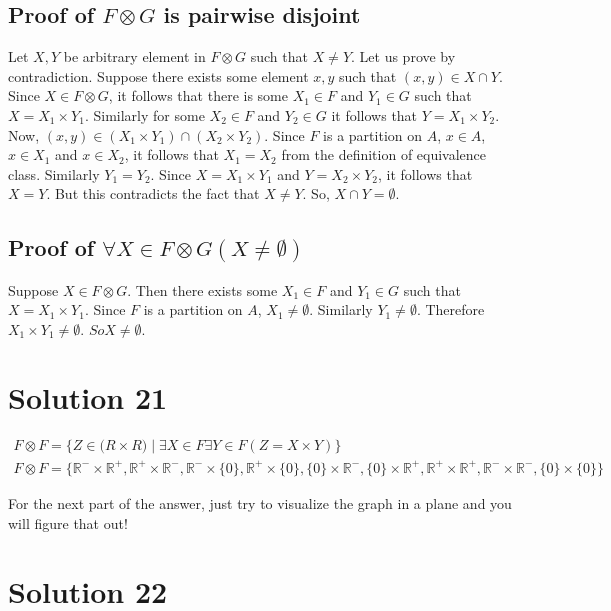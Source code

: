 \documentclass{article}
\begin{document}
\subsection{Proof of $F \otimes G$ is pairwise disjoint}
Let $X,Y$ be arbitrary element in $F \otimes G$ such that $X \neq Y$.
Let us prove by contradiction. Suppose there exists some element $x,y$
such that $(x,y) \in X \cap Y$. Since $X \in F \otimes G$, it follows
that there is some $X_1 \in F$ and $Y_1 \in G$ such that $X = X_1
\times Y_1$. Similarly for some $X_2 \in F$ and $Y_2 \in G$ it follows
that $Y = X_1 \times Y_2$. Now, $(x,y) \in (X_1 \times Y_1) \cap (X_2
\times Y_2)$. Since $F$ is a partition on $A$, $x \in A$, $x \in X_1$
and $x \in X_2$, it follows that $X_1 = X_2$ from the definition of
equivalence class. Similarly $Y_1 = Y_2$. Since $X = X_1 \times Y_1$
and $Y = X_2 \times Y_2$, it follows that $X = Y$. But this
contradicts the fact that $X \neq Y$. So, $X \cap Y = \emptyset$.

\subsection{Proof of $\forall X \in F \otimes G(X \neq \emptyset)$}
Suppose $X \in F \otimes G$. Then there exists some $X_1 \in F$ and
$Y_1 \in G$ such that $X = X_1 \times Y_1$. Since $F$ is a partition
on $A$, $X_1 \neq \emptyset$. Similarly $Y_1 \neq \emptyset$.
Therefore $X_1 \times Y_1 \neq \emptyset$. $So X \neq \emptyset$.

\section{Solution 21}
\begin{align*}
  F \otimes F = \{Z \in \mathbb(R \times R) \mid \exists X \in F
  \exists Y \in F(Z = X \times Y)\} \\
  F \otimes F = \{\mathbb{R}^- \times \mathbb{R}^+, \mathbb{R}^+
  \times \mathbb{R}^-, \mathbb{R}^- \times \{0\}, \mathbb{R}^{+}
  \times \{0\}, \{0\} \times \mathbb{R}^-, \{0\} \times \mathbb{R}^+,
  \mathbb{R}^+ \times \mathbb{R}^+, \mathbb{R}^- \times \mathbb{R}^-,
  \{0\} \times \{0\} \}
\end{align*}

For the next part of the answer, just try to visualize the graph in a
plane and you will figure that out!

\section{Solution 22}
\end{document}
